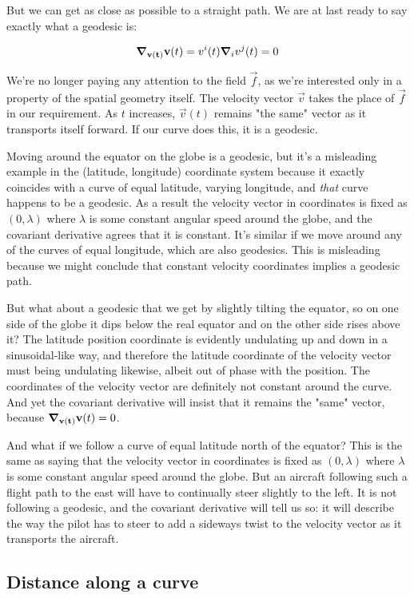 But we can get as close as possible to a straight path. We are at last ready to say exactly what a geodesic is:

$$
\grad_{\mathbf{v(t)}} \mathbf{v}(t)
=
v^i(t) \grad_i v^j(t) = 0
$$

We're no longer paying any attention to the field $\vec{f}$, as we're interested only in a property of the spatial geometry itself. The velocity vector $\vec{v}$ takes the place of $\vec{f}$ in our requirement. As $t$ increases, $\vec{v}(t)$ remains "the same" vector as it transports itself forward. If our curve does this, it is a geodesic.

Moving around the equator on the globe is a geodesic, but it's a misleading example in the (latitude, longitude) coordinate system because it exactly coincides with a curve of equal latitude, varying longitude, and \textit{that} curve happens to be a geodesic. As a result the velocity vector in coordinates is fixed as $(0, \lambda)$ where $\lambda$ is some constant angular speed around the globe, and the covariant derivative agrees that it is constant. It's similar if we move around any of the curves of equal longitude, which are also geodesics. This is misleading because we might conclude that constant velocity coordinates implies a geodesic path.

But what about a geodesic that we get by slightly tilting the equator, so on one side of the globe it dips below the real equator and on the other side rises above it? The latitude position coordinate is evidently undulating up and down in a sinusoidal-like way, and therefore the latitude coordinate of the velocity vector must being undulating likewise, albeit out of phase with the position. The coordinates of the velocity vector are definitely not constant around the curve. And yet the covariant derivative will insist that it remains the "same" vector, because $\grad_{\mathbf{v(t)}} \mathbf{v}(t) = 0$.

And what if we follow a curve of equal latitude north of the equator? This is the same as saying that the velocity vector in coordinates is fixed as $(0, \lambda)$ where $\lambda$ is some constant angular speed around the globe. But an aircraft following such a flight path to the east will have to continually steer slightly to the left. It is not following a geodesic, and the covariant derivative will tell us so: it will describe the way the pilot has to steer to add a sideways twist to the velocity vector as it transports the aircraft.

\subsection{Distance along a curve}

